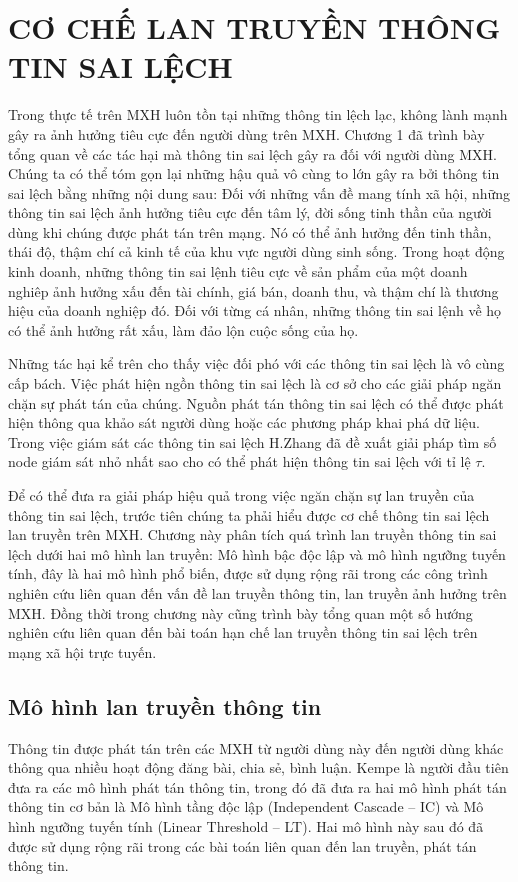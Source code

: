 \chapter{CƠ CHẾ LAN TRUYỀN THÔNG TIN SAI LỆCH}
\label{chap:2}
Trong thực tế trên MXH luôn tồn tại những thông tin lệch lạc, không lành mạnh gây ra ảnh hưởng tiêu cực đến người dùng trên MXH. Chương 1 đã trình bày tổng quan về các tác hại mà thông tin sai lệch gây ra đối với người dùng MXH. Chúng ta có thể tóm gọn lại những hậu quả vô cùng to lớn gây ra bởi thông tin sai lệch bằng những nội dung sau: Đối với những vấn đề mang tính xã hội, những thông tin sai lệch ảnh hưởng tiêu cực đến tâm lý, đời sống tinh thần của người dùng khi chúng được phát tán trên mạng. Nó có thể ảnh hưởng đến tinh thần, thái độ, thậm chí cả kinh tế của khu vực người dùng sinh sống. Trong hoạt động kinh doanh, những thông tin sai lệnh tiêu cực về sản phẩm của một doanh nghiêp ảnh hưởng xấu đến tài chính, giá bán, doanh thu, và thậm chí là thương hiệu của doanh nghiệp đó. Đối với từng cá nhân, những thông tin sai lệnh về họ có thể ảnh hưởng rất xấu, làm đảo lộn cuộc sống của họ. 

Những tác hại kể trên cho thấy việc đối phó với các thông tin sai lệch là vô cùng cấp bách. Việc phát hiện ngồn thông tin sai lệch là cơ sở cho các giải pháp ngăn chặn sự phát tán của chúng. Nguồn phát tán thông tin sai lệch có thể được phát hiện thông qua khảo sát người dùng hoặc các phương pháp khai phá dữ liệu. Trong việc giám sát các thông tin sai lệch H.Zhang \cite{zhang1} đã đề xuất giải pháp tìm số node giám sát nhỏ nhất sao cho có thể phát hiện thông tin sai lệch với tỉ lệ $\tau$. 

Để có thể đưa ra giải pháp hiệu quả trong việc ngăn chặn sự lan truyền của thông tin sai lệch, trước tiên chúng ta phải hiểu được cơ chế thông tin sai lệch lan truyền trên MXH. Chương này phân tích quá trình lan truyền thông tin sai lệch dưới hai mô hình lan truyền: Mô hình bậc độc lập và mô hình ngưỡng tuyến tính, đây là hai mô hình phổ biến, được sử dụng rộng rãi trong các công trình nghiên cứu liên quan đến vấn đề lan truyền thông tin, lan truyền ảnh hưởng trên MXH. Đồng thời trong chương này cũng trình bày tổng quan một số hướng nghiên cứu liên quan đến bài toán hạn chế lan truyền thông tin sai lệch trên mạng xã hội trực tuyến.


\section{Mô hình lan truyền thông tin}
Thông tin được phát tán trên các MXH từ người dùng này đến người dùng khác thông qua nhiều hoạt động đăng bài, chia sẻ, bình luận. Kempe \cite{kemple1} là người đầu tiên đưa ra các mô hình phát tán thông tin, trong đó đã đưa ra hai mô hình phát tán thông tin cơ bản là Mô hình tầng độc lập (Independent Cascade – IC) và Mô hình ngưỡng tuyến tính (Linear Threshold – LT). Hai mô hình này sau đó đã được sử dụng rộng rãi trong các bài toán liên quan đến lan truyền, phát tán thông tin.

